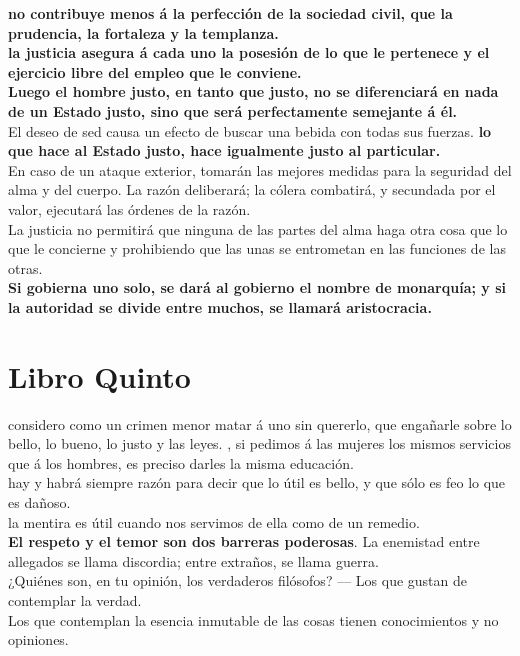\documentclass[10pt]{book}
\begin{document}
\textbf{no contribuye menos á la perfección de la sociedad civil, que la prudencia, la fortaleza y la templanza.}\\
\textbf{la justicia asegura á cada uno la posesión de lo que le pertenece y el ejercicio libre del  empleo que le conviene. }\\
\textbf{Luego el hombre justo, en tanto que justo, no se diferenciará en nada de un Estado justo, sino que será perfectamente semejante á él.}\\
El deseo de sed causa un efecto de buscar una bebida con todas sus fuerzas.
\textbf{lo que hace al Estado justo, hace igualmente justo al particular. } \\
En caso de un ataque exterior, tomarán las mejores medidas para la seguridad del alma y del cuerpo. La razón deliberará; la cólera combatirá, y secundada por el valor, ejecutará las órdenes de la razón. \\
La justicia no permitirá que ninguna de las partes del alma haga otra cosa que lo que le concierne y prohibiendo que las unas se entrometan en las funciones de las otras.\\
\textbf{ Si gobierna uno solo, se dará al gobierno el nombre de monarquía; y si la autoridad se divide entre muchos, se llamará aristocracia. }


\chapter*{Libro Quinto}
considero como un crimen menor matar á uno sin quererlo, que engañarle sobre lo bello, lo bueno, lo justo y las leyes. , si pedimos á las mujeres los mismos servicios que á los hombres, es preciso darles la misma educación. \\
hay y habrá siempre razón para decir que lo útil es bello, y que sólo es feo lo que es dañoso. \\
la mentira es útil cuando nos servimos de ella como de un remedio. \\
\textbf{El respeto y el temor son dos barreras poderosas}. La enemistad entre allegados se llama discordia; entre extraños, se llama guerra. \\
¿Quiénes son, en tu opinión, los verdaderos filósofos? — Los que gustan de contemplar la verdad. \\
Los que contemplan la esencia inmutable de las cosas tienen conocimientos y no opiniones.
\end{document}
